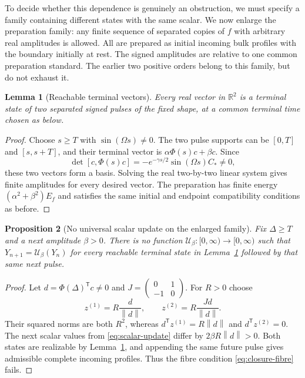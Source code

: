\documentclass[11pt,a4paper]{article}
\newtheorem{proposition}{Proposition}[section]
\newtheorem{lemma}[proposition]{Lemma}
\theoremstyle{remark}
\newcommand{\norm}[1]{\left\lVert#1\right\rVert}
\newcommand{\R}{\mathbb R}
\begin{document}
To decide whether this dependence is genuinely an obstruction, we must
specify a family containing different states with the same scalar.
We now enlarge the preparation family: any finite sequence of separated
copies of $f$ with arbitrary real amplitudes is allowed. All are prepared
as initial incoming bulk profiles with the boundary initially at rest.
The signed amplitudes are relative to one common preparation standard.
The earlier two positive orders belong to this family, but do not exhaust it.

\begin{lemma}[Reachable terminal vectors]
\label{lem:reachable}
Every real vector in $\R^2$ is a terminal state of two separated signed
pulses of the fixed shape, at a common terminal time chosen as below.
\end{lemma}
\begin{proof}
Choose $s\ge T$ with $\sin(\Omega s)\ne0$. The two pulse supports can
be $[0,T]$ and $[s,s+T]$, and their terminal vector is
$\alpha\Phi(s)c+\beta c$. Since
\begin{equation}
 \det[c,\Phi(s)c]=-e^{-\gamma s/2}\sin(\Omega s)C_*\ne0,
 \label{eq:reachability}
\end{equation}
these two vectors form a basis. Solving the real two-by-two linear
system gives finite amplitudes for every desired vector. The preparation
has finite energy $(\alpha^2+\beta^2)E_f$ and satisfies the same initial
and endpoint compatibility conditions as before.
\end{proof}

\begin{proposition}[No universal scalar update on the enlarged family]
\label{prop:nonclosure}
Fix $\Delta\ge T$ and a next amplitude $\beta>0$. There is no function
$\mathcal U_\beta:[0,\infty)\to[0,\infty)$ such that
$Y_{n+1}=\mathcal U_\beta(Y_n)$ for every reachable terminal state in
Lemma~\ref{lem:reachable} followed by that same next pulse.
\end{proposition}
\begin{proof}
Let $d=\Phi(\Delta)^{\mathsf T}c\ne0$ and
$J=\left(\begin{smallmatrix}0&1\\-1&0\end{smallmatrix}\right)$.
For $R>0$ choose
\begin{equation}
 z^{(1)}=R\frac d{\norm d},\qquad
 z^{(2)}=R\frac{Jd}{\norm d}.
 \label{eq:witnesses}
\end{equation}
Their squared norms are both $R^2$, whereas
$d^{\mathsf T}z^{(1)}=R\norm d$ and $d^{\mathsf T}z^{(2)}=0$.
The next scalar values from \eqref{eq:scalar-update} differ by
$2\beta R\norm d>0$. Both states are realizable by
Lemma~\ref{lem:reachable}, and appending the same future pulse gives
admissible complete incoming profiles. Thus the fibre condition
\eqref{eq:closure-fibre} fails.
\end{proof}
\end{document}
